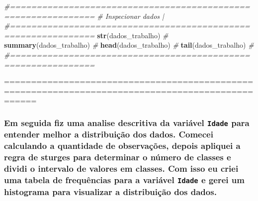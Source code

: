\documentclass[
]{article}
\newenvironment{Shaded}{\begin{snugshade}}{\end{snugshade}}
\newcommand{\CommentTok}[1]{\textcolor[rgb]{0.56,0.35,0.01}{\textit{#1}}}
\newcommand{\FunctionTok}[1]{\textcolor[rgb]{0.13,0.29,0.53}{\textbf{#1}}}
\newcommand{\NormalTok}[1]{#1}
\begin{document}
\begin{Shaded}
\begin{Highlighting}[]
\CommentTok{\#==============================================================}
\CommentTok{\# Inspecionar dados                                           |}
\CommentTok{\#==============================================================}
\FunctionTok{str}\NormalTok{(dados\_trabalho)                                           }\CommentTok{\# }
\FunctionTok{summary}\NormalTok{(dados\_trabalho)                                       }\CommentTok{\# }
\FunctionTok{head}\NormalTok{(dados\_trabalho)                                          }\CommentTok{\# }
\FunctionTok{tail}\NormalTok{(dados\_trabalho)                                          }\CommentTok{\# }
\CommentTok{\#==============================================================}
\end{Highlighting}
\end{Shaded}

==================================================================================================

\subsubsection{\texorpdfstring{Em seguida fiz uma analise descritiva da
variável \texttt{Idade} para entender melhor a distribuição dos dados.
Comecei calculando a quantidade de observações, depois apliquei a regra
de sturges para determinar o número de classes e dividi o intervalo de
valores em classes. Com isso eu criei uma tabela de frequências para a
variável \texttt{Idade} e gerei um histograma para visualizar a
distribuição dos
dados.}{Em seguida fiz uma analise descritiva da variável Idade para entender melhor a distribuição dos dados. Comecei calculando a quantidade de observações, depois apliquei a regra de sturges para determinar o número de classes e dividi o intervalo de valores em classes. Com isso eu criei uma tabela de frequências para a variável Idade e gerei um histograma para visualizar a distribuição dos dados.}}\label{em-seguida-fiz-uma-analise-descritiva-da-variuxe1vel-idade-para-entender-melhor-a-distribuiuxe7uxe3o-dos-dados.-comecei-calculando-a-quantidade-de-observauxe7uxf5es-depois-apliquei-a-regra-de-sturges-para-determinar-o-nuxfamero-de-classes-e-dividi-o-intervalo-de-valores-em-classes.-com-isso-eu-criei-uma-tabela-de-frequuxeancias-para-a-variuxe1vel-idade-e-gerei-um-histograma-para-visualizar-a-distribuiuxe7uxe3o-dos-dados.}
\end{document}
